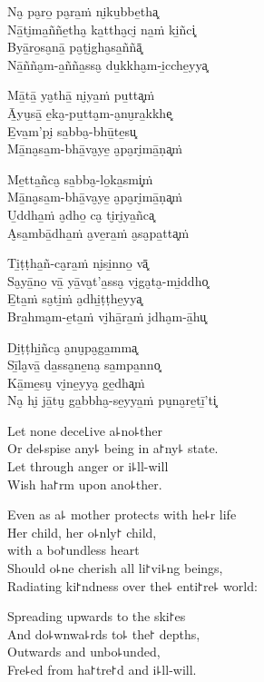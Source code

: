 Na̮ pa̮ro̱ pa̮ra̱ṁ ni̮ku̱bbe̱tha͓\\
Nā̱ti̮ma̱ññe̱tha̮ ka̱ttha̮ci̮ na̱ṁ ki̱ñci͓\\
Byā̱ro̱sa̮nā̱ pa̮ṭi̮gha̮sa̱ññā͓\\
Nā̱ñña̮m-a̱ñña̱ssa̮ du̱kkha̮m-i̱cche̱yya͓

Mā̱tā̱ ya̮thā̱ ni̮ya̱ṁ pu̱tta͓ṁ\\
Ā̱yu̮sā̱ e̱ka̮-pu̱tta̮m-a̮nu̮ra̱kkhe͓\\
E̱va̱m'pi̮ sa̱bba̮-bhū̱te̱su͓\\
Mā̱na̮sa̱m-bhā̱va̮ye̱ a̮pa̮ri̮mā̱ṇa͓ṁ

Me̱tta̱ñca̮ sa̱bba̮-lo̱ka̱smi͓ṁ\\
Mā̱na̮sa̱m-bhā̱va̮ye̱ a̮pa̮ri̮mā̱ṇa͓ṁ\\
U̱ddha̱ṁ a̮dho̱ ca̮ ti̮ri̮ya̱ñca͓\\
A̮sa̱mbā̱dha̱ṁ a̮ve̱ra̱ṁ a̮sa̮pa̱tta͓ṁ

Ti̱ṭṭha̱ñ-ca̮ra̱ṁ ni̮si̱nno̱ vā͓\\
Sa̮yā̱no̱ vā̱ yā̱va̮t'a̱ssa̮ vi̮ga̮ta̮-mi̱ddho͓\\
E̱ta̱ṁ sa̮ti̱ṁ a̮dhi̱ṭṭhe̱yya͓\\
Bra̱hma̮m-e̱ta̱ṁ vi̮hā̱ra̱ṁ i̮dha̮m-ā̱hu͓

Di̱ṭṭhi̱ñca̮ a̮nu̮pa̮ga̱mma͓\\
Sī̱la̮vā̱ da̱ssa̮ne̱na̮ sa̱mpa̱nno͓\\
Kā̱me̱su̮ vi̮ne̱yya̮ ge̱dha͓ṁ\\
Na̮ hi̮ jā̱tu̮ ga̱bbha̮-se̱yya̱ṁ pu̮na̮re̱tī̱'ti͓

\clearpage

Let none dece꜖ive a꜕no꜕ther\\
Or de꜕spise any꜕ being in a꜓ny꜕ state.\\
Let  through anger or i꜕ll-will\\
Wish ha꜓rm upon ano꜕ther.

Even as a꜕ mother protects with he꜕r life\\
Her child, her o꜕nly꜓ child,\\
 with a bo꜓undless heart\\
Should o꜕ne cherish all li꜓vi꜕ng beings,\\
Radiating ki꜓ndness over the꜕ enti꜓re꜕ world:

Spreading upwards to the ski꜓es\\
And do꜕wnwa꜕rds to꜕ the꜓ depths,\\
Outwards and unbo꜕unded,\\
Fre꜕ed from ha꜓tre꜓d and i꜕ll-will.

